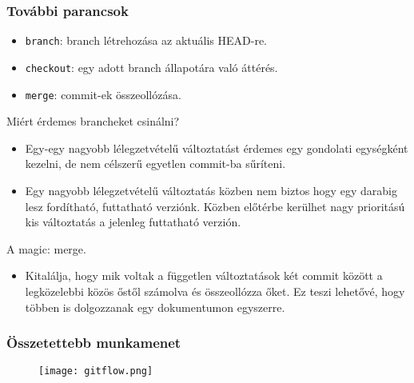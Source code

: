 	\begin{frame}
	  \frametitle{További parancsok}
	  \begin{itemize}
	    \item \lstinline|branch|: branch létrehozása az aktuális HEAD-re.
	    \item \lstinline|checkout|: egy adott branch állapotára való áttérés.
	    \item \lstinline|merge|: commit-ek összeollózása.
	  \end{itemize}
	  Miért érdemes brancheket csinálni?
	  \begin{itemize}
	    \item Egy-egy nagyobb lélegzetvételű változtatást érdemes egy gondolati egységként kezelni, de nem célszerű egyetlen commit-ba sűríteni.
	    \item Egy nagyobb lélegzetvételű változtatás közben nem biztos hogy egy darabig lesz fordítható, futtatható verziónk. Közben előtérbe kerülhet nagy prioritású kis változtatás a jelenleg futtatható verzión.
	  \end{itemize}
	  A \git magic: merge.
	  \begin{itemize}
	    \item{Kitalálja, hogy mik voltak a független változtatások két commit között a legközelebbi közös őstől számolva és összeollózza őket.
	      Ez teszi lehetővé, hogy többen is dolgozzanak egy dokumentumon egyszerre.}
	  \end{itemize}
	\end{frame}
	\begin{frame}
	  \frametitle{Összetettebb munkamenet}
	  \begin{figure}
	    \centering
	    \texttt{[image: gitflow.png]}
	  \end{figure}
	\end{frame}
